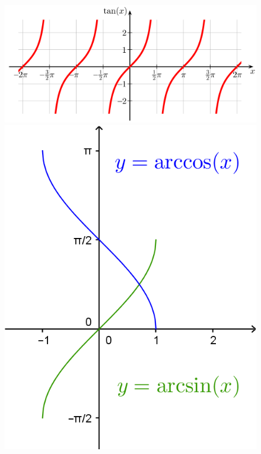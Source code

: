 \begin{figure}[!htb]
	\centering
	\begin{minipage}{.5\textwidth}
		\centering
		\includegraphics[width=1\linewidth]{images/tan.png}
	\end{minipage}%
	\begin{minipage}{0.5\textwidth}
		\centering
		\includegraphics{images/asinacos.png}
	\end{minipage}
\end{figure}


